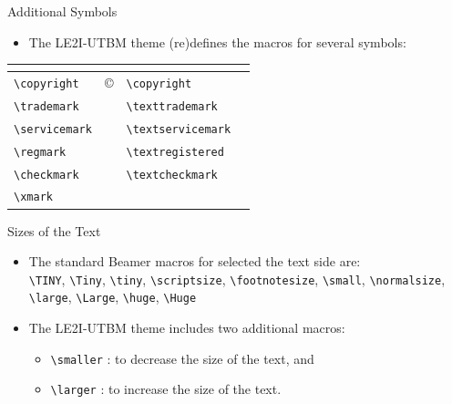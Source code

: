 \documentclass[english,sectioncirclenumberstyle]{le2iutbmbeamer}
\begin{document}
\begin{frame}{Additional Symbols}
	\begin{itemize}
	\item The LE2I-UTBM theme (re)defines the macros for several symbols:
	\end{itemize}
	\begin{tabularx}{\linewidth}{|l|X|l|X|}
	\hline
	\tabularheading\multicolumn{2}{|c|}{\chead{From LE2I-UTBM theme}} & \multicolumn{2}{c|}{\chead{From \TeX}} \\
	\hline
	\texttt{{\textbackslash}copyright} & \copyright & \texttt{{\textbackslash}copyright} & \textcopyright \\
	\hline
	\texttt{{\textbackslash}trademark} & \trademark & \texttt{{\textbackslash}texttrademark} & \texttrademark \\
	\hline
	\texttt{{\textbackslash}servicemark} & \servicemark & \texttt{{\textbackslash}textservicemark} & \textservicemark \\
	\hline
	\texttt{{\textbackslash}regmark} & \regmark & \texttt{{\textbackslash}textregistered} & \textregistered \\
	\hline
	\texttt{{\textbackslash}checkmark} & \checkmark & \texttt{{\textbackslash}textcheckmark} & \textcheckmark \\
	\hline
	\texttt{{\textbackslash}xmark} & \xmark & & \\
	\hline
	\end{tabularx}
\end{frame}

\begin{frame}{Sizes of the Text}
	\begin{itemize}
	\item The standard Beamer macros for selected the text side are: \\
		{\TINY\texttt{{\textbackslash}TINY}}, {\Tiny\texttt{{\textbackslash}Tiny}}, {\tiny\texttt{{\textbackslash}tiny}}, {\scriptsize\texttt{{\textbackslash}scriptsize}}, {\footnotesize\texttt{{\textbackslash}footnotesize}}, {\small\texttt{{\textbackslash}small}}, {\normalsize\texttt{{\textbackslash}normalsize}}, {\large\texttt{{\textbackslash}large}}, {\Large\texttt{{\textbackslash}Large}}, {\huge\texttt{{\textbackslash}huge}}, {\Huge\texttt{{\textbackslash}Huge}}
	\vspace{1em}
	\item The LE2I-UTBM theme includes two additional macros:
		\begin{itemize}
		\item \texttt{{\textbackslash}smaller} : to decrease the size of the text, and
		\item \texttt{{\textbackslash}larger} : to increase the size of the text.
		\end{itemize}
	\end{itemize}
\end{frame}
\end{document}
